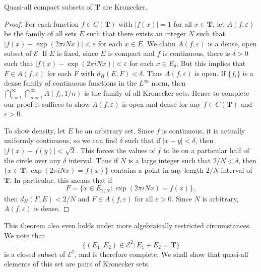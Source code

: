 \begin{theorem}
	Quasi-all compact subsets of $\mathbf{T}$ are Kronecker.
\end{theorem}
\begin{proof}
	For each function $f \in C(\mathbf{T})$ with $|f(x)| = 1$ for all $x \in \mathbf{T}$, let $A(f,\varepsilon)$ be the family of all sets $E$ such that there exists an integer $N$ such that $|f(x) - \exp(2 \pi i N x)| < \varepsilon$ for each $x \in E$. We claim $A(f,\varepsilon)$ is a dense, open subset of $\mathcal{E}$. If $E$ is fixed, since $E$ is compact and $f$ is continuous, there is $\delta > 0$ such that $|f(x) - \exp(2 \pi i N x)| < \varepsilon$ for each $x \in E_\delta$. But this implies that $F \in A(f,\varepsilon)$ for each $F$ with $d_H(E,F) < \delta$. Thus $A(f,\varepsilon)$ is open. If $\{ f_i \}$ is a dense family of continuous functions in the $L^\infty$ norm, then $\bigcap_{i = 1}^\infty \bigcap_{n = 1}^\infty A(f_i,1/n)$ is the family of all Kronecker sets. Hence to complete our proof it suffices to show $A(f,\varepsilon)$ is open and dense for any $f \in C(\mathbf{T})$ and $\varepsilon > 0$.

	To show density, let $E$ be an arbitrary set. Since $f$ is continuous, it is actually uniformly continuous, so we can find $\delta$ such that if $|x - y| < \delta$, then $|f(x) - f(y)| < \sqrt{2}$. This forces the values of $f$ to lie on a particular half of the circle over any $\delta$ interval. Thus if $N$ is a large integer such that $2/N < \delta$, then $\{ x \in \mathbf{T}: \exp(2 \pi i N x) = f(x) \}$ contains a point in any length $2/N$ interval of $\mathbf{T}$. In particular, this means that if
	\[ F = \{ x \in E_{2/N} : \exp(2 \pi i N x) = f(x) \}, \]
	then $d_H(F,E) < 2/N$ and $F \in A(f,\varepsilon)$ for all $\varepsilon > 0$. Since $N$ is arbitrary, $A(f,\varepsilon)$ is dense.
\end{proof}

This theorem also even holds under more algebraically restricted circumstances. We note that
%
\[ \{ (E_1,E_2) \in \mathcal{E}^2: E_1 + E_2 = \mathbf{T} \} \]
%
is a closed subset of $\mathcal{E}^2$, and is therefore complete. We shall show that quasi-all elements of this set are pairs of Kronecker sets.

